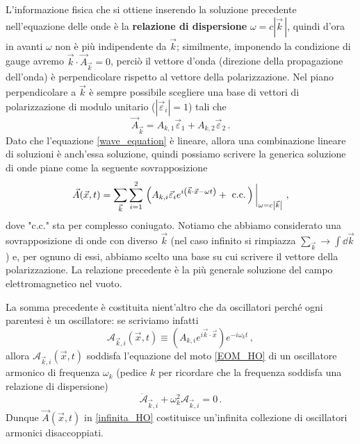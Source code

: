 \noindent L'informazione fisica che si ottiene inserendo la soluzione precedente nell'equazione delle onde è la \textbf{relazione di dispersione} $\omega = c |\vec{k}\,|$, quindi d'ora in avanti $\omega$ non è più indipendente da $\vec{k}$; similmente, imponendo la condizione di gauge avremo $\vec{k} \cdot \vec{A}_{\vec{k}} = 0$, perciò il vettore d'onda (direzione della propagazione dell'onda) è perpendicolare rispetto al vettore della polarizzazione. Nel piano perpendicolare a $\vec{k}$ è sempre possibile scegliere una base di vettori di polarizzazione di modulo unitario ($|\vec{\varepsilon}_i| = 1$) tali che 
\begin{equation*}
    \vec{A}_{\vec{k}} = A_{k,1} \vec{\varepsilon}_1 + A_{k,2} \vec{\varepsilon}_2 \, .
\end{equation*}
Dato che l'equazione \eqref{wave_equation} è lineare, allora una combinazione lineare di soluzioni è anch'essa soluzione, quindi possiamo scrivere la generica soluzione di onde piane come la seguente sovrapposizione
\begin{equation}\label{infinita_HO}
    \vec{A}(\vec{x}, t) = \sum_{\vec{k}} \sum_{i=1}^2 \eval{\left( A_{k,i} \vec{\varepsilon}_i e^{i \left( \vec{k} \cdot \vec{x} - \omega t \right)} + \text{ c.c.} \, \right)}_{\omega = c \abs{\vec{k}}} \, ,
\end{equation}
dove "c.c." sta per complesso coniugato. Notiamo che abbiamo considerato una sovrapposizione di onde con diverso $\vec{k}$ (nel caso infinito si rimpiazza $\sum_{\vec{k}} \to \int \dd{\vec{k}}$) e, per ognuno di essi, abbiamo scelto una base su cui scrivere il vettore della polarizzazione. La relazione precedente è la più generale soluzione del campo elettromagnetico nel vuoto.

\noindent La somma precedente è costituita nient'altro che da oscillatori perché ogni parentesi è un oscillatore: se scriviamo infatti
\begin{equation*}
    \mathcal{A}_{\vec{k},i}(\vec{x}, t) \equiv \left( A_{k,i} e^{i \vec{k} \cdot \vec{x}} \right) e^{-i \omega_k t} \, ,
\end{equation*}
allora $\mathcal{A}_{\vec{k},i}(\vec{x}, t)$ soddisfa l'equazione del moto \eqref{EOM_HO} di un oscillatore armonico di frequenza $\omega_k$ (pedice $k$ per ricordare che la frequenza soddisfa una relazione di dispersione)
\begin{equation*}
    \ddot{\mathcal{A}}_{\vec{k},i} + \omega_k^2 \mathcal{A}_{\vec{k},i} = 0 \, .
\end{equation*}
Dunque $\vec{A}(\vec{x}, t)$ in \eqref{infinita_HO} costituisce un'infinita collezione di oscillatori armonici disaccoppiati. 


